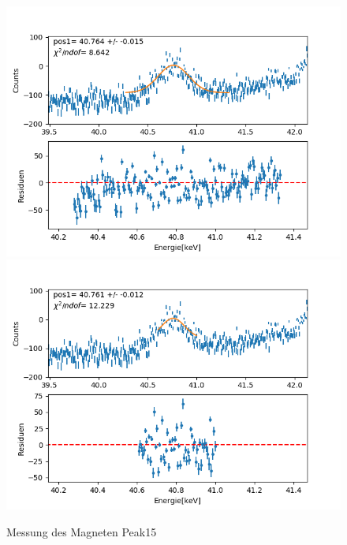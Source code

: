 \documentclass[12pt,a4paper]{article}
\begin{document}
\begin{figure}[H]
\centering
\includegraphics[scale=0.49]{Bilder/roentgen_spektren/magnet/mag15_1.png}
\includegraphics[scale=0.49]{Bilder/roentgen_spektren/magnet/mag15_2.png}
\caption{Messung des Magneten Peak15}
\end{figure}
\end{document}

